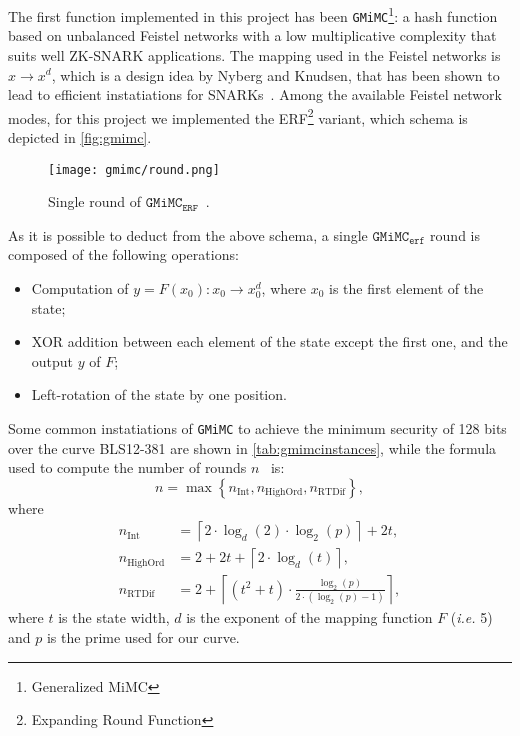 \documentclass[12pt, a4paper]{report}
\begin{document}
The first function implemented in this project has been \texttt{GMiMC}\footnote{Generalized MiMC}: a hash function based on unbalanced Feistel networks with a low multiplicative complexity that suits well ZK-SNARK applications. The mapping used in the Feistel networks is $x \rightarrow x^d$, which is a design idea by Nyberg and Knudsen, that has been shown to lead to efficient instatiations for SNARKs~\cite{mimc}. Among the available Feistel network modes, for this project we implemented the ERF\footnote{Expanding Round Function} variant, which schema is depicted in \autoref{fig:gmimc}.

\begin{figure}[H]
  \begin{center}
    \texttt{[image: gmimc/round.png]}
  \end{center}
  \caption{Single round of $\texttt{GMiMC}_\texttt{ERF}$~\cite[Fig.~2]{gmimc}.}\label{fig:gmimc}
\end{figure}

As it is possible to deduct from the above schema, a single $\texttt{GMiMC}_\texttt{erf}$ round is composed of the following operations:
\begin{itemize}
  \item Computation of $y = F(x_0): x_0 \rightarrow x_0^d$, where $x_0$ is the first element of the state;
  \item XOR addition between each element of the state except the first one, and the output $y$ of $F$;
  \item Left-rotation of the state by one position.
\end{itemize}

Some common instatiations of \texttt{GMiMC} to achieve the minimum security of 128 bits over the curve BLS12-381 are shown in \autoref{tab:gmimcinstances}, while the formula used to compute the number of rounds $n$~\cite[Tab.~2,Tab.~3]{gmimc} is:
\begin{equation}
  n = \max \left\{ n_{\text{Int}}, n_{\text{HighOrd}}, n_{\text{RTDif}} \right\},
  \label{eq:gmimcrounds}
\end{equation}
where
\begin{align}
  n_{\text{Int}} & = \left \lceil 2 \cdot \log_d(2) \cdot \log_2(p) \right\rceil + 2t ,\\[10pt]
  n_{\text{HighOrd}} & = 2 + 2t + \left \lceil 2 \cdot \log_d(t) \right\rceil ,\\[6pt]
  n_{\text{RTDif}} & = 2 + \left \lceil (t^2 + t) \cdot \frac{\log_2(p)}{2 \cdot (\log_2(p) - 1)} \right\rceil ,
\end{align}
where $t$ is the state width, $d$ is the exponent of the mapping function $F$ (\textsl{i.e.} 5) and $p$ is the prime used for our curve.
\end{document}
